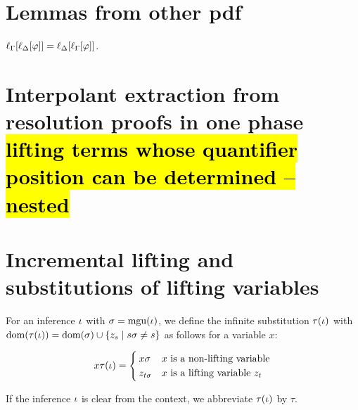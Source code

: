 \documentclass[,%
	draft=false,%
	numbers=noendperiod
	11pt,
	a4paper,
	oneside,%
	openany,
]{memoir}
\begin{document}
\tableofcontents

\section{Lemmas from other pdf}
\begin{lemma}
	\label{lemma:lifting_order_not_relevant}
	$\ell_{\Gamma}[\ell_{\Delta}[\varphi]] = \ell_{\Delta}[\ell_{\Gamma}[\varphi]]$.
\end{lemma}

\clearpage

\section{Interpolant extraction from resolution proofs in one phase \hl{lifting terms whose quantifier position can be determined -- nested}}

\section{Incremental lifting and substitutions of lifting variables}

\begin{defi}
	For an inference $\iota$ with $\sigma = \operatorname{mgu}(\iota)$, we define the infinite substitution $\tau(\iota)$ with $\operatorname{dom}(\tau(\iota)) = \operatorname{dom}(\sigma) \cup \{z_s \mid s\sigma \neq s\}$ as follows for a variable $x$:

	\[
		x\tau(\iota) =
		\begin{cases}
			x\sigma & \text{$x$ is a non-lifting variable} \\
			z_{t\sigma} & \text{$x$ is a lifting variable $z_t$}
		\end{cases} 
	\]

	If the inference $\iota$ is clear from the context, we abbreviate $\tau(\iota)$ by $\tau$. 
\end{defi}
\end{document}
